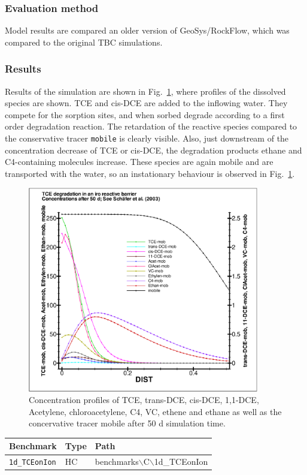 \subsubsection*{Evaluation method}

Model results are compared an older version of GeoSys/RockFlow, which was compared to the original TBC simulations.

\subsubsection*{Results}

Results of the simulation are shown in Fig.~\ref{profiles_TCEonIon}, where profiles of the dissolved species are shown. TCE and cis-DCE are added to the inflowing water. They compete for the sorption sites, and when sorbed degrade according to a first order degradation reaction. The retardation of the reactive species compared to the conservative tracer \texttt{mobile} is clearly visible. Also, just downstream of the concentration decrease of TCE or cis-DCE, the degradation products ethane and C4-containing molecules increase. These species are again mobile and are transported with the water, so an instationary behaviour is observed in Fig.~\ref{profiles_TCEonIon}.

\begin{figure}[htbp]
\centering
\includegraphics[width=0.9\textwidth]{C/figures/1d_TCEonIon.eps}
\caption{Concentration profiles of TCE, trans-DCE, cis-DCE, 1,1-DCE, Acetylene, chloroacetylene, C4, VC, ethene and ethane as well as the concervative tracer mobile after 50 d simulation time.}
\label{profiles_TCEonIon}
\end{figure}


\begin{table}[htbp]
\centering
\begin{tabular}{|l|l|l|}
\hline
Benchmark & Type & Path \\
\hline
\texttt{1d\_TCEonIon}& HC &  benchmarks$\backslash$C$\backslash$1d\_TCEonIon  \\			
\hline
\end{tabular}
\end{table}



